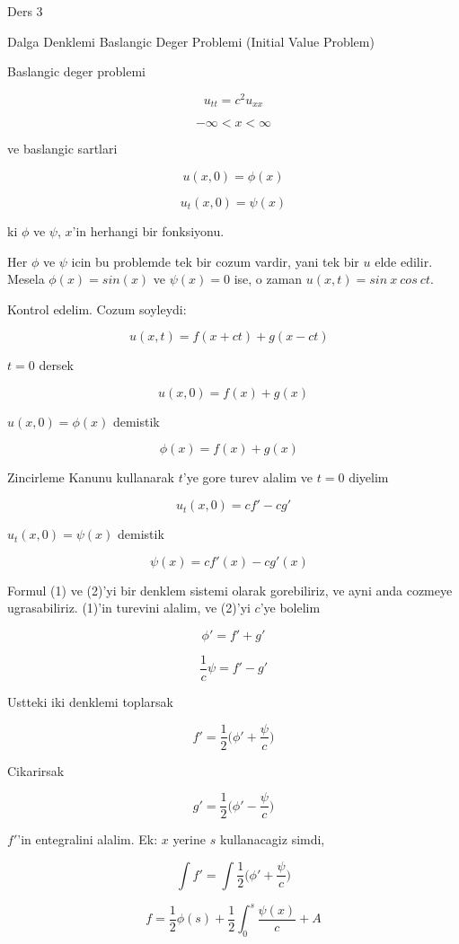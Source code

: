 \documentclass[12pt,fleqn]{article}
\begin{document}
Ders 3

Dalga Denklemi Baslangic Deger Problemi (Initial Value Problem) 

Baslangic deger problemi 

\[ u_{tt} = c^2u_{xx} \]

\[ -\infty < x < \infty \]

ve baslangic sartlari 

\[ u(x,0) = \phi(x) \]

\[ u_t(x,0) = \psi(x) \]

ki $\phi$ ve $\psi$, $x$'in herhangi bir fonksiyonu. 

Her $\phi$ ve $\psi$ icin bu problemde tek bir cozum vardir, yani tek bir
$u$ elde edilir. Mesela $\phi(x) = sin(x)$ ve $\psi(x) = 0$ ise, o zaman
$u(x,t) = sin \ x \ cos \ ct$. 

Kontrol edelim. Cozum soyleydi:

\[ u(x,t) = f(x+ct) + g(x-ct) \ \ \ \label{5}\]

$t=0$ dersek 

\[ u(x,0)  = f(x) + g(x) \]

$u(x,0) = \phi(x)$ demistik

\[ \phi(x) = f(x) + g(x) \ \ \ \label{1} \]

Zincirleme Kanunu kullanarak $t$'ye gore turev alalim ve $t=0$ diyelim

\[ u_t(x,0) = cf' - cg' \]

$u_t(x,0) = \psi(x)$ demistik

\[ \psi(x) = cf'(x) - cg'(x) \ \ \ \label{2} \]

Formul (1) ve (2)'yi bir denklem sistemi olarak gorebiliriz, ve ayni anda
cozmeye ugrasabiliriz. (1)'in turevini alalim, ve (2)'yi $c$'ye bolelim

\[ \phi' = f' + g' \]

\[ \frac{1}{c}\psi = f' - g' \]

Ustteki iki denklemi toplarsak

\[ f' = \frac{1}{2} \bigg( \phi' + \frac{\psi}{c}  \bigg) \]

Cikarirsak

\[ g' = \frac{1}{2}  \bigg( \phi' - \frac{\psi}{c}  \bigg) \]


$f'$'in entegralini alalim. Ek: $x$ yerine $s$ kullanacagiz simdi,

\[ \int f' = \int \frac{1}{2} \bigg( \phi' + \frac{\psi}{c}  \bigg) \]

\[ f = \frac{1}{2}\phi(s) + \frac{1}{2}\int_0^s \frac{\psi(x)}{c} + A\]
\end{document}
